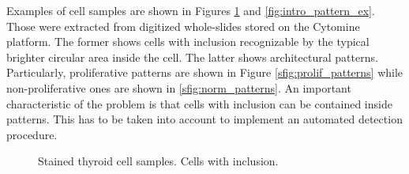 Examples of cell samples are shown in Figures \ref{fig:intro_inclu_ex} and \ref{fig:intro_pattern_ex}. Those were extracted from digitized whole-slides stored on the Cytomine platform. The former shows cells with inclusion recognizable by the typical brighter circular area inside the cell. The latter shows architectural patterns. Particularly, proliferative patterns are shown in Figure \ref{sfig:prolif_patterns} while non-proliferative ones are shown in \ref{sfig:norm_patterns}. An important characteristic of the problem is that cells with inclusion can be contained inside patterns. This has to be taken into account to implement an automated detection procedure. 


\begin{figure}
	\center
	\caption{Stained thyroid cell samples. Cells with inclusion.}
	\label{fig:intro_inclu_ex}
\end{figure}

